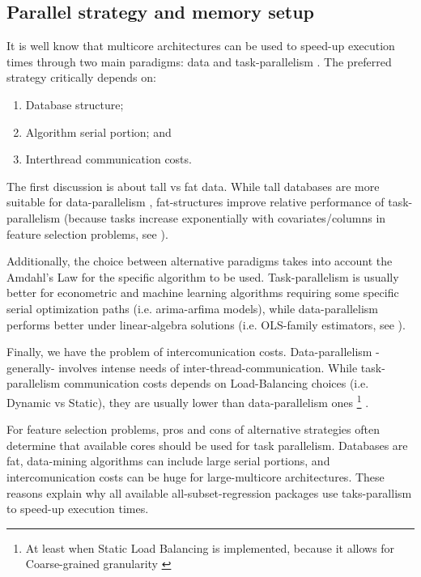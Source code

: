 \documentclass{juliacon}
\begin{document}
\subsection{Parallel strategy and memory setup}
\label{subsub:parallelst}
It is well know that multicore architectures can be used to speed-up execution times through two main paradigms: data and task-parallelism \cite{zaki2001}. The preferred strategy critically depends on:
\begin{enumerate}
    \item Database structure;
    \item Algorithm serial portion; and
    \item Interthread communication costs.
\end{enumerate} 
The first discussion is about tall vs fat data. While tall databases are more suitable for data-parallelism \cite{babu2013}, fat-structures improve relative performance of task-parallelism (because tasks increase exponentially with covariates/columns in feature selection problems, see \cite{foster1994}). \vskip 6pt

Additionally, the choice between alternative paradigms takes into account the Amdahl's Law for the specific algorithm to be used. Task-parallelism is usually better for econometric and machine learning algorithms requiring some specific serial optimization paths (i.e. arima-arfima models), while data-parallelism performs better under linear-algebra solutions (i.e. OLS-family estimators, see \cite{guo2012}). \vskip 6pt

Finally, we have the problem of intercomunication costs. Data-parallelism -generally- involves intense needs of inter-thread-communication. While task-parallelism communication costs depends on Load-Balancing choices (i.e. Dynamic vs Static), they are usually lower than data-parallelism ones \footnote{At least when Static Load Balancing is implemented, because it allows for Coarse-grained granularity \cite{gordon2006}} \cite{MOREANO2017}. \vskip 6pt

For feature selection problems, pros and cons of alternative strategies often determine that available cores should be used for task parallelism. Databases are fat, data-mining algorithms can include large serial portions, and intercomunication costs can be huge for large-multicore architectures. These reasons explain why all available all-subset-regression packages use taks-parallism to speed-up execution times. \vskip 6pt
\end{document}
